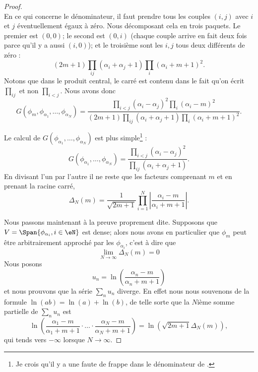 \begin{proof}
\begin{equation}
    \end{equation}
    En ce qui concerne le dénominateur, il faut prendre tous les couples \( (i,j)\) avec \( i\) et \( j\) éventuellement égaux à zéro. Nous décomposant cela en trois paquets. Le premier est \( (0,0)\); le second est \( (0,i)\) (chaque couple arrive en fait deux fois parce qu'il y a aussi \( (i,0)\)); et le troisième sont les \( i,j\) tous deux différents de zéro :
    \begin{equation}
        (2m+1)\prod_{ij}(\alpha_i+\alpha_j+1)\prod_i(\alpha_i+m+1)^2.
    \end{equation}
    Notons que dans le produit central, le carré est contenu dans le fait qu'on écrit \( \prod_{ij}\) et non \( \prod_{i<j}\). Nous avons donc
    \begin{equation}
        G(\phi_m,\phi_{\alpha_1},\ldots, \phi_{\alpha_N})=\frac{ \prod_{i<j}(\alpha_i-\alpha_j)^2\prod_i(\alpha_i-m)^2 }{ (2m+1)\prod_{ij}(\alpha_i+\alpha_j+1)\prod_i(\alpha_i+m+1)^2 }.
    \end{equation}
    
    Le calcul de \( G(\phi_{\alpha_1},\ldots, \phi_{\alpha_N})\) est plus simple\footnote{Je crois qu'il y a une faute de frappe dans le dénominateur de \cite{jqZSyG}.} :
    \begin{equation}
        G(\phi_{\alpha_1},\ldots, \phi_{\alpha_N})=\frac{ \prod_{i<j}(\alpha_i-\alpha_j)^2 }{ \prod_{ij}(\alpha_i+\alpha_j+1) }.    
    \end{equation}
    En divisant l'un par l'autre il ne reste que les facteurs comprenant \( m\) et en prenant la racine carré,
    \begin{equation}    \label{EqANiuNB}
        \Delta_N(m)=\frac{1}{ \sqrt{2m+1} }\prod_{i=1}^N\left| \frac{ \alpha_i-m }{ \alpha_i+m+1 } \right| .
    \end{equation}
    
    Nous passons maintenant à la preuve proprement dite. Supposons que \( V=\Span\{ \phi_{\alpha_i},i\in \eN \}\) est dense; alors nous avons en particulier que \( \phi_m\) peut être arbitrairement approché par les \( \phi_{\alpha_i}\), c'est à dire que
    \begin{equation}
        \lim_{N\to \infty} \Delta_N(m)=0
    \end{equation}
    Nous posons 
    \begin{equation}
        u_n=\ln\left( \frac{ \alpha_n-m }{ \alpha_n+m+1 } \right)
    \end{equation}
    et nous prouvons que la série \( \sum_nu_n\) diverge. En effet nous nous souvenons de la formule \( \ln(ab)=\ln(a)+\ln(b)\), de telle sorte que la \( N\)ième somme partielle de \( \sum_nu_n\) est
    \begin{equation}
        \ln\left( \frac{ \alpha_1-m }{ \alpha_1+m+1 }\cdot\ldots\cdot \frac{ \alpha_N-m }{ \alpha_N+m+1 } \right)=\ln\left( \sqrt{2m+1}\Delta_N(m) \right),
    \end{equation}
    qui tends vers \( -\infty\) lorsque \( N\to \infty\).


\end{proof}
